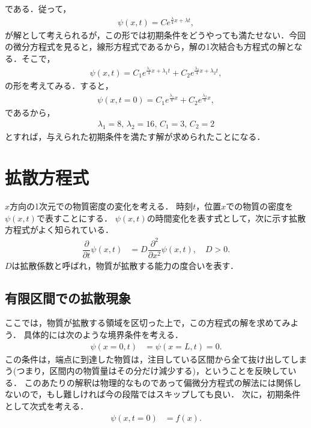 である．従って，
\begin{align}
\psi\left(x,t\right)	=Ce^{\frac{\lambda}{4}x+\lambda t},
\end{align}
が解として考えられるが，この形では初期条件をどうやっても満たせない．今回の微分方程式を見ると，線形方程式であるから，解の1次結合も方程式の解となる．そこで，
\begin{align}
\psi\left(x,t\right)	=C_{1}e^{\frac{\lambda_{1}}{4}x+\lambda_{1}t}+C_{2}e^{\frac{\lambda_{2}}{4}x+\lambda_{2}t},
\end{align}
の形を考えてみる．すると，
\begin{align}
\psi\left(x,t=0\right)	=C_{1}e^{\frac{\lambda_{1}}{4}x}+C_{2}e^{\frac{\lambda_{2}}{4}x},
\end{align}
であるから，
\begin{align}
\lambda_{1}	=8,\,\lambda_{2}=16,\,C_{1}=3,\,C_{2}=2
\end{align}
とすれば，与えられた初期条件を満たす解が求められたことになる．
%
\section{拡散方程式}
%
$x$方向の1次元での物質密度の変化を考える．
時刻$t$，位置$x$での物質の密度を$\psi(x,t)$で表すことにする．
$\psi(x,t)$の時間変化を表す式として，次に示す拡散方程式がよく知られている．
%
\begin{align}
\dfrac{\partial}{\partial t}\psi\left(x,t\right) & =D\dfrac{\partial^{2}}{\partial x^{2}}\psi\left(x,t\right),\quad D>0.
\label{diffusion_eq_1d}
\end{align}
%
$D$は拡散係数と呼ばれ，物質が拡散する能力の度合いを表す．
%
\subsection{有限区間での拡散現象}
%

ここでは，物質が拡散する領域を区切った上で，この方程式の解を求めてみよう．
具体的には次のような境界条件を考える．
\begin{align}
\psi\left(x=0,t\right) & =\psi\left(x=L,t\right)=0.
\end{align}
この条件は，端点に到達した物質は，注目している区間から全て抜け出してしまう(つまり，区間内の物質量はその分だけ減少する)，ということを反映している．
このあたりの解釈は物理的なものであって偏微分方程式の解法には関係しないので，もし難しければ今の段階ではスキップしても良い．
次に，初期条件として次式を考える．
\begin{align}
\psi\left(x,t=0\right) & =f\left(x\right).
\end{align}

